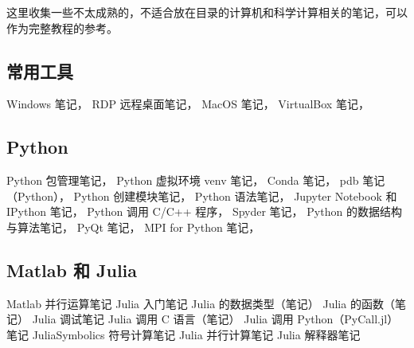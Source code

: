 
这里收集一些不太成熟的，不适合放在目录的计算机和科学计算相关的笔记，可以作为完整教程的参考。

\subsection{常用工具}
Windows 笔记，
RDP 远程桌面笔记，
MacOS 笔记，
VirtualBox 笔记，

\subsection{Python}
Python 包管理笔记，
Python 虚拟环境 venv 笔记，
Conda 笔记，
pdb 笔记（Python），
Python 创建模块笔记，
Python 语法笔记，
Jupyter Notebook 和 IPython 笔记，
Python 调用 C/C++ 程序，
Spyder 笔记，
Python 的数据结构与算法笔记，
PyQt 笔记，
MPI for Python 笔记，

\subsection{Matlab 和 Julia}
Matlab 并行运算笔记
Julia 入门笔记
Julia 的数据类型（笔记）
Julia 的函数（笔记）
Julia 调试笔记
Julia 调用 C 语言（笔记）
Julia 调用 Python（PyCall.jl）笔记
JuliaSymbolics 符号计算笔记
Julia 并行计算笔记
Julia 解释器笔记

